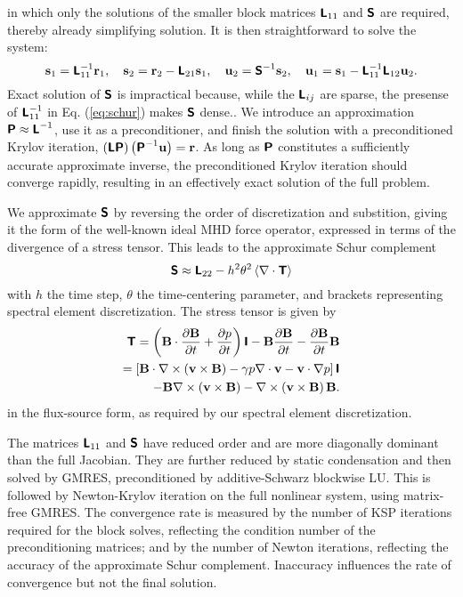\documentclass{report}
\begin{document}
in which only the solutions of the smaller block matrices $\hbox{\sffamily\bfseries L}_{11}$
and $\hbox{\sffamily\bfseries S}$ are required, thereby already simplifying solution. It is
then straightforward to solve the system:
\begin{equation}
\hbox{\bfseries s}_1 = \hbox{\sffamily\bfseries L}_{11}^{-1} \hbox{\bfseries r}_1, \quad
\hbox{\bfseries s}_2 = \hbox{\bfseries r}_2 - \hbox{\sffamily\bfseries L}_{21} \hbox{\bfseries s}_1, \quad
\hbox{\bfseries u}_2 = \hbox{\sffamily\bfseries S}^{-1} \hbox{\bfseries s}_2, \quad
\hbox{\bfseries u}_1 = \hbox{\bfseries s}_1 - \hbox{\sffamily\bfseries L}_{11}^{-1} \hbox{\sffamily\bfseries L}_{12} \hbox{\bfseries u}_2.
\label{eq:solution}
\end{equation}
Exact solution of $\hbox{\sffamily\bfseries S}$ is impractical because, while the $\hbox{\sffamily\bfseries L}_{ij}$
are sparse, the presense of $\hbox{\sffamily\bfseries L}_{11}^{-1}$ in Eq. (\ref{eq:schur})
makes $\hbox{\sffamily\bfseries S}$ dense.. We introduce an approximation $\hbox{\sffamily\bfseries P} \approx
\hbox{\sffamily\bfseries L}^{-1}$, use it as a preconditioner, and finish the solution with a
preconditioned Krylov iteration, $\left( \hbox{\sffamily\bfseries L} \hbox{\sffamily\bfseries P} \right) \left(
\hbox{\sffamily\bfseries P}^{-1} \hbox{\bfseries u} \right) = \hbox{\bfseries r}$. As long as $\hbox{\sffamily\bfseries P}$ constitutes a
sufficiently accurate approximate inverse, the preconditioned Krylov
iteration should converge rapidly, resulting in an effectively exact
solution of the full problem.

We approximate $\hbox{\sffamily\bfseries S}$ by reversing the order of discretization and
substition, giving it the form of the well-known ideal MHD force
operator, expressed in terms of the divergence of a stress tensor. This
leads to the approximate Schur complement
\begin{equation}
\hbox{\sffamily\bfseries S} \approx \hbox{\sffamily\bfseries L}_{22}
- h^2 \theta^2 \left< \nabla \cdot \hbox{\sffamily\bfseries T} \right>
\end{equation}
with $h$ the time step, $\theta$ the time-centering parameter, and
brackets representing spectral element discretization. The stress
tensor is given by
\begin{eqnarray}
\hbox{\sffamily\bfseries T} = \left( \hbox{\bfseries B} \cdot \frac{\partial \hbox{\bfseries B}}{\partial t}
+ \frac{\partial p}{\partial t} \right) \hbox{\sffamily\bfseries I}
- \hbox{\bfseries B} \frac{\partial \hbox{\bfseries B}}{\partial t}
- \frac{\partial \hbox{\bfseries B}}{\partial t} \hbox{\bfseries B} \nonumber \\
= \left[ \hbox{\bfseries B} \cdot \nabla \times \left(\hbox{\bfseries v} \times \hbox{\bfseries B} \right)
- \gamma p \nabla \cdot \hbox{\bfseries v} - \hbox{\bfseries v} \cdot \nabla p \right] \hbox{\sffamily\bfseries I} \\
- \hbox{\bfseries B} \nabla \times \left(\hbox{\bfseries v} \times \hbox{\bfseries B} \right)
- \nabla \times \left(\hbox{\bfseries v} \times \hbox{\bfseries B} \right) \hbox{\bfseries B}. \nonumber
\end{eqnarray}
in the flux-source form, as required by our spectral element
discretization.

The matrices $\hbox{\sffamily\bfseries L}_{11}$ and $\hbox{\sffamily\bfseries S}$ have reduced order and are more
diagonally dominant than the full Jacobian. They are further reduced by
static condensation and then solved by GMRES, preconditioned by
additive-Schwarz blockwise LU. This is followed by Newton-Krylov
iteration on the full nonlinear system, using matrix-free GMRES. The
convergence rate is measured by the number of KSP iterations required
for the block solves, reflecting the condition number of the
preconditioning matrices; and by the number of Newton iterations,
reflecting the accuracy of the approximate Schur complement. Inaccuracy
influences the rate of convergence but not the final solution.
\end{document}
